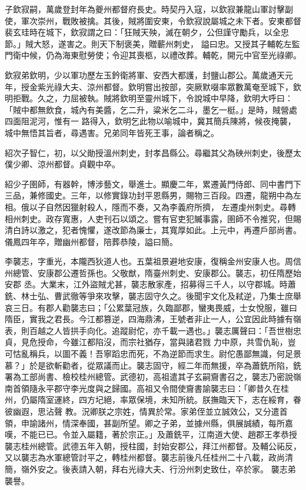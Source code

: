 \begin{pinyinscope}
 子欽寂嗣，萬歲登封年為夔州都督府長史。時契丹入寇，以欽寂兼龍山軍討擊副使，軍次崇州，戰敗被擒。其後，賊將圍安東，令欽寂說屬城之未下者。安東都督裴玄珪時在城下，欽寂謂之曰：「狂賊天殃，滅在朝夕，公但謹守勵兵，以全忠節。」賊大怒，遂害之。則天下制褒美，贈蘄州刺史，
 謚曰忠。又授其子輔乾左監門衛中候，仍為海東慰勞使；令迎其喪柩，以禮改葬。輔乾，開元中官至光祿卿。



 欽寂弟欽明，少以軍功歷左玉鈐衛將軍、安西大都護，封鹽山郡公。萬歲通天元年，授金紫光祿大夫、涼州都督。欽明嘗出按部，突厥默啜率眾數萬奄至城下，欽明拒戰。久之，力屈被執。賊將欽明至靈州城下，令說城中早降，欽明大呼曰：「賊中都無飲食，城內有美醬，乞二升，粱米乞二斗，墨乞一梃。」是時，賊營處四面阻泥河，惟有一
 路得入，欽明乞此物以喻城中，冀其簡兵陳將，候夜掩襲，城中無悟其旨者，尋遇害。兄弟同年皆死王事，論者稱之。



 紹次子智仁，初，以父勛授溫州刺史，封孝昌縣公。尋繼其父為硤州刺史，後歷太僕少卿、涼州都督。貞觀中卒。



 紹少子圉師，有器幹，博涉藝文，舉進士。顯慶二年，累遷黃門侍郎、同中書門下三品，兼修國史。三年，以修實錄功封平恩縣男，賜物三百段。四遷，龍朔中為左相。俄以子自然因獵射殺人，隱而不奏，又為李義府所擠，
 左遷虔州刺史。尋轉相州刺史。政存寬惠，人吏刊石以頌之。嘗有官吏犯贓事露，圉師不令推究，但賜清白詩以激之，犯者愧懼，遂改節為廉士，其寬厚如此。上元中，再遷戶部尚書。儀鳳四年卒，贈幽州都督，陪葬恭陵，謚曰簡。



 李襲志，字重光，本隴西狄道人也。五葉祖景避地安康，復稱金州安康人也。周信州總管、安康郡公遷哲孫也。父敬猷，隋臺州刺史、安康郡公。襲志，初任隋歷始安郡
 丞。大業末，江外盜賊尤甚，襲志散家產，招募得三千人，以守郡城。時蕭銑、林士弘、曹武徹等爭來攻擊，襲志固守久之。後聞宇文化及弒逆，乃集士庶舉哀三日。有郡人勸襲志曰；「公累葉冠族，久臨鄙郡，蠻夷畏威，士女悅服，雖曰隋臣，實我之君長。今江都篡逆，四海鼎沸，王號者非止一人，公宜因此時據有嶺表，則百越之人皆拱手向化。追蹤尉佗，亦千載一遇也。」襲志厲聲曰：「吾世樹忠貞，見危授命，今雖江都陷沒，而宗社猶存，當與諸君戮
 力中原，共雪仇恥，豈可怙亂稱兵，以圖不義！吾寧蹈忠而死，不為逆節而求生。尉佗愚鄙無識，何足景慕？」於是欲斬勸者，從眾議而止。襲志固守，經二年而無援，卒為蕭銑所陷，銑署為工部尚書、檢校桂州總管。武德初，高祖遣其子玄嗣齎書召之，襲志乃密說嶺南首領隨永平郡守李光度與之歸國。高祖又令間使齎書諭襲志曰：「卿昔久在桂州，仍屬隋室運終，四方圮絕，率眾保境，未知所統。朕撫臨天下，志在綏育，眷彼幽遐，思沾聲
 教。況卿朕之宗姓，情異於常。家弟侄並立誠效公，又分遣首領，申諭諸州，情深奉國，甚副所望。卿之子弟，並據州縣，俱展誠績，每所嘉嘆，不能已已。令並入屬籍，著於宗正。」及蕭銑平，江南道大使、趙郡王孝恭授襲志桂州總管。武德五年入朝，授柱國，封始安郡公，拜江州都督。及輔公祏反，又以襲志為水軍總管討平之，轉桂州都督。襲志前後凡任桂州二十八載，政尚清簡，嶺外安之。後表請入朝，拜右光祿大夫、行汾州刺史致仕，卒於家。
 襲志弟襲譽。




\end{pinyinscope}
